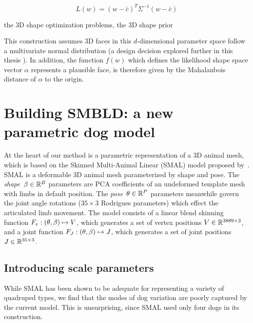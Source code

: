 \begin{equation}
    L(w) = (w - \bar{c})^T\Sigma^{-1}(w-\bar{c})
\end{equation}


the 3D shape optimization problems, the 3D shape prior 

This construction assumes 3D faces in this $d$-dimensional parameter space follow a multivariate normal distribution (a design decision explored further in this thesis ). In addition, the function $f(w)$ which defines the likelihood shape space vector $\alpha$ represents a plausible face, is therefore given by the Mahalanbois distance of $\alpha$ to the origin. 


\section{Building SMBLD: a new parametric dog model}


At the heart of our method is a parametric representation of a 3D animal mesh, which is based on the Skinned Multi-Animal Linear (SMAL) model proposed by~\cite{zuffi2017menagerie}. SMAL is a deformable 3D animal mesh parameterized by shape and pose. The \emph{shape}~$\beta \in {\mathbb{R}^{B}}$ parameters are PCA coefficients of an undeformed template mesh with limbs in default position. The \emph{pose}~$\theta \in {\mathbb{R}^{P}}$ parameters meanwhile govern the joint angle rotations ($35 \times 3$ Rodrigues parameters) which effect the articulated limb movement. The model consists of a linear blend skinning function $F_{v}: (\theta, \beta) \mapsto V$, which generates a set of vertex positions $V \in {\mathbb{R}^{3889 \times 3}}$, and a joint function $F_{J}: (\theta, \beta) \mapsto J$, which generates a set of joint positions $J \in {\mathbb{R}^{35 \times 3}}$.

\subsection{Introducing scale parameters}
While SMAL has been shown to be adequate for representing a variety of quadruped types, we find that the modes of dog variation are poorly captured by the current model. This is unsurprising, since SMAL used only four dogs in its construction.

